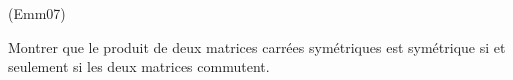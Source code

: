 \begin{tiny}(Emm07)\end{tiny}
Montrer que le produit de deux matrices carrées sym{\'e}triques est sym{\'e}trique si et seulement si les deux matrices commutent.